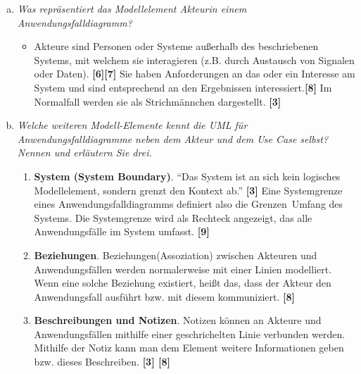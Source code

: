 \begin{enumerate}[a)]
\begin{itemize}
    \end{itemize}
    
    \item {\itshape Was repräsentiert das Modellelement Akteurin einem Anwendungsfalldiagramm?}
    \begin{itemize}
        \item Akteure sind Personen oder Systeme außerhalb des beschriebenen Systems, mit welchem sie interagieren (z.B. durch Austausch von Signalen oder Daten). \textbf{[6][7]} Sie haben Anforderungen an das oder ein Interesse am System und sind entsprechend an den Ergebnissen interessiert.\textbf{[8]} Im Normalfall werden sie als Strichmännchen dargestellt. \textbf{[3]} 
    \end{itemize}
    
    \item {\itshape Welche weiteren Modell-Elemente kennt die UML für Anwendungsfalldiagramme neben dem Akteur und dem Use Case selbst? Nennen und erläutern Sie drei.}
    \begin{enumerate}[1.]
        \item \textbf{System (System Boundary)}. ``Das System ist an sich kein logisches Modellelement, sondern grenzt den Kontext ab.'' \textbf{[3]} Eine Systemgrenze eines Anwendungsfalldiagramms definiert also die Grenzen\ Umfang des Systems. Die Systemgrenze wird als Rechteck angezeigt, das alle Anwendungsfälle im System umfasst. \textbf{[9]}
        \item \textbf{Beziehungen}. Beziehungen(Assoziation) zwischen Akteuren und Anwendungsfällen werden normalerweise mit einer Linien modelliert. Wenn eine solche Beziehung existiert, heißt das, dass der Akteur den Anwendungsfall ausführt bzw. mit diesem kommuniziert. \textbf{[8]}
        \item \textbf{Beschreibungen und Notizen}. Notizen können an Akteure und Anwendungsfällen mithilfe einer geschrichelten Linie verbunden werden. Mithilfe der Notiz kann man dem Element weitere Informationen geben bzw. dieses Beschreiben. \textbf{[3] [8]}
    \end{enumerate}
    

\end{enumerate}

